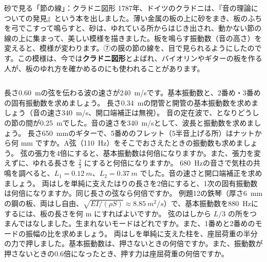 \begin{column}{砂で見る「節の線」：クラドニ図形}
1787年、ドイツのクラドニは、『音の理論についての発見』という本を出しました。薄い金属の板の上に砂をまき、板のふちを弓でこすって鳴らすと、砂は、ゆれている所からはじき出され、動かない節の線の上に集まって、美しい模様を描きました。板を鳴らす振動数（音の高さ）を変えると、模様が変わります。⑦の膜の節の線を、目で見られるようにしたのです。この模様は、今では\textbf{クラドニ図形}とよばれ、バイオリンやギターの板を作る人が、板のゆれ方を確かめるのにも使われることがあります。
\end{column}

\bkendproblems
{}
\bkproblem 長さ\qty{0.60}{m}の弦を伝わる波の速さが\qty{240}{m/s}です。基本振動数と、2番め・3番めの固有振動数を求めましょう。
\bkproblem 長さ\qty{0.34}{m}の閉管と開管の基本振動数を求めましょう（音の速さ\qty{340}{m/s}、開口端補正は無視）。
\bkproblem 音の定在波で、となりどうしの節の間が\qty{0.25}{m}でした。音の速さを\qty{340}{m/s}として、波長と振動数を求めましょう。
\bkproblem 長さ\qty{650}{mm}のギターで、5番めのフレット（5半音上げる所）はナットから何 mm ですか。A弦（\qty{110}{Hz}）をそこでおさえたときの振動数も求めましょう。
\bkproblem 弦の張力を4倍にすると、基本振動数は何倍になりますか。また、張力を変えずに、ゆれる長さを $\tfrac23$ にすると何倍になりますか。
\bkproblem \qty{680}{Hz}の音さで気柱の共鳴を調べると、$L_1=\qty{0.12}{m}$、$L_2=\qty{0.37}{m}$ でした。音の速さと開口端補正を求めましょう。
\bkproblem 両はしを単純に支えたはりの長さを2倍にすると、1次の固有振動数は何倍になりますか。同じ長さの弦なら何倍ですか。
\bkproblem 例題12の鉄琴（厚さ\qty{6}{mm}の鋼の板、両はし自由、$\sqrt{EI/(\rho S)}\approx\qty{8.85}{m^2/s}$）で、基本振動数を\qty{880}{Hz}にするには、板の長さを何 m にすればよいですか。
\bkproblem 弦のはしから $L/3$ の所をつまんではなしました。生まれないモードはどれですか。また、1番めと2番めのモードの振幅の比を求めましょう。
\bkproblem 両はしを単純に支えた柱を、座屈荷重の半分の力で押しました。基本振動数は、押さないときの何倍ですか。また、振動数が押さないときの0.6倍になったとき、押す力は座屈荷重の何倍ですか。

